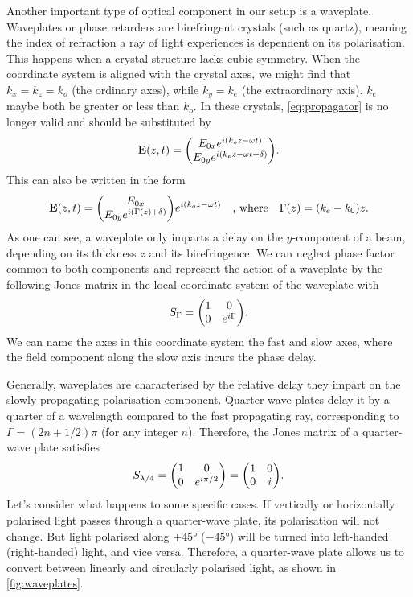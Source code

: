 Another important type of optical component in our setup is a waveplate. Waveplates or phase retarders are birefringent crystals (such as quartz), meaning the index of refraction a ray of light experiences is dependent on its polarisation. This happens when a crystal structure lacks cubic symmetry. When the coordinate system is aligned with the crystal axes, we might find that $ k_x = k_z = k_o $ (the ordinary axes), while $ k_y = k_e $ (the extraordinary axis). $ k_e $ maybe both be greater or less than $ k_o $. In these crystals, \autoref{eq:propagator} is no longer valid and should be substituted by
\begin{equation}
	\vb{E}(z, t) = \mqty(\Eox e^{i(k_o z-\omega t)} \\ \Eoy e^{i(k_e z-\omega t + \delta)} ).
\end{equation}
This can also be written in the form
\begin{equation}
	\vb{E}(z, t) = \mqty(\Eox  \\ \Eoy e^{i(\Gamma(z) + \delta)} ) e^{i(k_o z-\omega t)}
	\qq{, where}
	\Gamma(z) = (k_e-k_0) z.
\end{equation}
As one can see, a waveplate only imparts a delay on the $ y $-component of a beam, depending on its thickness $ z $ and its birefringence. We can neglect phase factor common to both components and represent the action of a waveplate by the following Jones matrix in the local coordinate system of the waveplate with
\begin{equation}
	S_\Gamma = \mqty(1 & 0 \\ 0 & e^{i\Gamma}).
\end{equation}
We can name the axes in this coordinate system the fast and slow axes, where the field component along the slow axis incurs the phase delay.

Generally, waveplates are characterised by the relative delay they impart on the slowly propagating polarisation component. Quarter-wave plates delay it by a quarter of a wavelength compared to the fast propagating ray, corresponding to $ \Gamma = (2n + 1/2)\pi $ (for any integer $ n $). Therefore, the Jones matrix of a quarter-wave plate satisfies 
\begin{equation}
	S_\qwp = \mqty(1 & 0 \\ 0 & e^{i\pi/2}) = \mqty(1 & 0 \\ 0 & i).
\end{equation}
Let's consider what happens to some specific cases. If vertically or horizontally polarised light passes through a quarter-wave plate, its polarisation will not change. But light polarised along $ +\ang{45} $ ($ -\ang{45} $) will be turned into left-handed (right-handed) light, and vice versa. Therefore, a quarter-wave plate allows us to convert between linearly and circularly polarised light, as shown in \autoref{fig:waveplates}.


